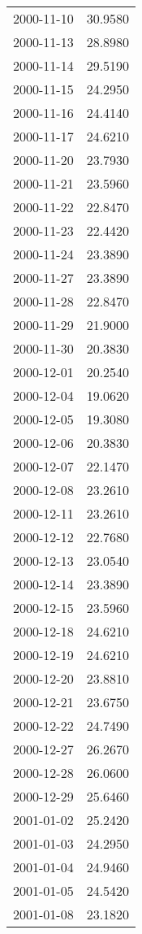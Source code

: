 \begin{tabular}{lr}
2000-11-10 &     30.9580 \\
2000-11-13 &     28.8980 \\
2000-11-14 &     29.5190 \\
2000-11-15 &     24.2950 \\
2000-11-16 &     24.4140 \\
2000-11-17 &     24.6210 \\
2000-11-20 &     23.7930 \\
2000-11-21 &     23.5960 \\
2000-11-22 &     22.8470 \\
2000-11-23 &     22.4420 \\
2000-11-24 &     23.3890 \\
2000-11-27 &     23.3890 \\
2000-11-28 &     22.8470 \\
2000-11-29 &     21.9000 \\
2000-11-30 &     20.3830 \\
2000-12-01 &     20.2540 \\
2000-12-04 &     19.0620 \\
2000-12-05 &     19.3080 \\
2000-12-06 &     20.3830 \\
2000-12-07 &     22.1470 \\
2000-12-08 &     23.2610 \\
2000-12-11 &     23.2610 \\
2000-12-12 &     22.7680 \\
2000-12-13 &     23.0540 \\
2000-12-14 &     23.3890 \\
2000-12-15 &     23.5960 \\
2000-12-18 &     24.6210 \\
2000-12-19 &     24.6210 \\
2000-12-20 &     23.8810 \\
2000-12-21 &     23.6750 \\
2000-12-22 &     24.7490 \\
2000-12-27 &     26.2670 \\
2000-12-28 &     26.0600 \\
2000-12-29 &     25.6460 \\
2001-01-02 &     25.2420 \\
2001-01-03 &     24.2950 \\
2001-01-04 &     24.9460 \\
2001-01-05 &     24.5420 \\
2001-01-08 &     23.1820 \\

\end{tabular}
